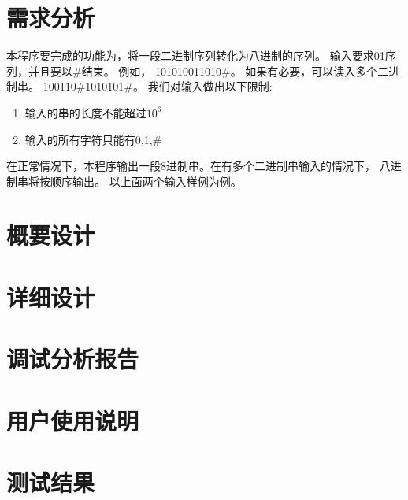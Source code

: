\section{需求分析}

本程序要完成的功能为，将一段二进制序列转化为八进制的序列。
输入要求01序列，并且要以\#结束。
例如，
101010011010\#。
如果有必要，可以读入多个二进制串。
100110\#1010101\#。
我们对输入做出以下限制:
\begin{enumerate}
   \item 输入的串的长度不能超过$10^6$
   \item 输入的所有字符只能有0,1,\#
\end{enumerate}


在正常情况下，本程序输出一段8进制串。在有多个二进制串输入的情况下，
八进制串将按顺序输出。
以上面两个输入样例为例。



\section{概要设计}

\section{详细设计}

\section{调试分析报告}

\section{用户使用说明}

\section{测试结果}


